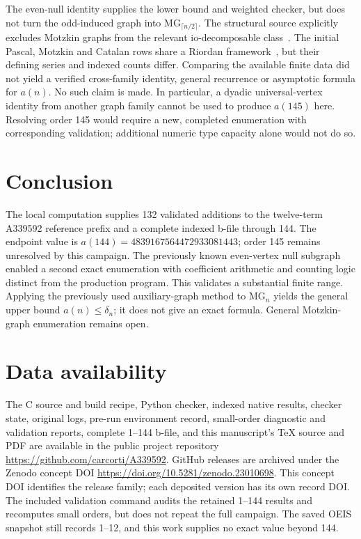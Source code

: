 \documentclass[11pt,a4paper]{article}
\newcommand{\MG}{\mathrm{MG}}
\begin{document}
The even-null identity supplies the lower bound and weighted checker, but
does not turn the odd-induced graph into $\MG_{\lceil n/2\rceil}$.
The structural source explicitly excludes Motzkin graphs from the relevant
io-decomposable class~\cite{structure}.  The initial Pascal, Motzkin and
Catalan rows share a Riordan framework~\cite{counting}, but their defining
series and indexed counts differ.  Comparing the available finite data
did not yield a verified cross-family identity, general recurrence or
asymptotic formula for $a(n)$.  No such claim is made.  In particular, a
dyadic universal-vertex identity from another graph family cannot be used
to produce $a(145)$ here.  Resolving order 145 would require a new,
completed enumeration with corresponding validation; additional numeric
type capacity alone would not do so.

\section{Conclusion}
The local computation supplies 132 validated additions to the twelve-term
A339592 reference prefix and a complete indexed b-file through 144.
The endpoint value is $a(144)=4839167564472933081443$; order 145 remains
unresolved by this campaign.  The previously known even-vertex null
subgraph enabled a
second exact enumeration with coefficient arithmetic and counting logic
distinct from the production program.  This validates a substantial finite
range.  Applying the previously used auxiliary-graph method to $\MG_n$
yields the general upper bound $a(n)\leq\delta_n$; it does not give
an exact formula.  General Motzkin-graph enumeration remains open.

\section*{Data availability}
The C source and build recipe, Python checker, indexed native results,
checker state, original logs, pre-run environment record, small-order
diagnostic and validation reports, complete 1--144 b-file, and this
manuscript's TeX source and PDF are available in the public project repository
\url{https://github.com/carcorti/A339592}.  GitHub releases are archived
under the Zenodo concept DOI
\url{https://doi.org/10.5281/zenodo.23010698}.  This concept DOI identifies
the release family; each deposited version has its own record DOI.  The
included validation command audits the retained 1--144 results and recomputes
small orders, but does not repeat the full campaign.  The saved OEIS snapshot
still records 1--12, and this work supplies no exact value beyond 144.
\end{document}
